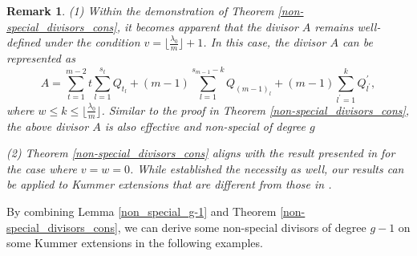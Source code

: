 \documentclass[journal,12pt,onecolumn]{IEEEtran}
\newtheorem{remark}[theorem]{Remark}
\begin{document}
\begin{remark}\label{non-special_divisors_cons_rem}
    {\rm (1)} Within the demonstration of Theorem \ref{non-special_divisors_cons},  it becomes apparent that the divisor $A$ remains well-defined under the condition $v=\big\lfloor\frac{\lambda_0}{m}\big\rfloor+1$. In this case, the divisor $A$ can be represented as
    \[
        A=\sum_{t=1}^{m-2}t\sum_{l=1}^{s_t}Q_{t_l}+ (m-1)\sum_{l=1}^{s_{m-1}-k}Q_{(m-1)_l} + (m-1)\sum_{l^\prime=1}^{k}Q^\prime_{l^\prime},
    \]
    where $w\le k\le \big\lfloor\frac{\lambda_0}{m}\big\rfloor$. Similar to the proof in Theorem \ref{non-special_divisors_cons}, the above divisor $A$ is also effective and non-special of degree $g$

    {\rm (2)} Theorem \ref{non-special_divisors_cons} aligns with the result presented in \cite{Explicit_Non-special_Divisors_of_Small_Degree} for the case where $v=w=0$. While \cite{Explicit_Non-special_Divisors_of_Small_Degree} established the necessity as well, our results can be applied to Kummer extensions that are different from those in \cite{Explicit_Non-special_Divisors_of_Small_Degree}. 
\end{remark}

By combining Lemma \ref{non_special_g-1} and Theorem \ref{non-special_divisors_cons}, we can derive some non-special divisors of degree $g-1$ on some Kummer extensions in the following examples. 
\end{document}
